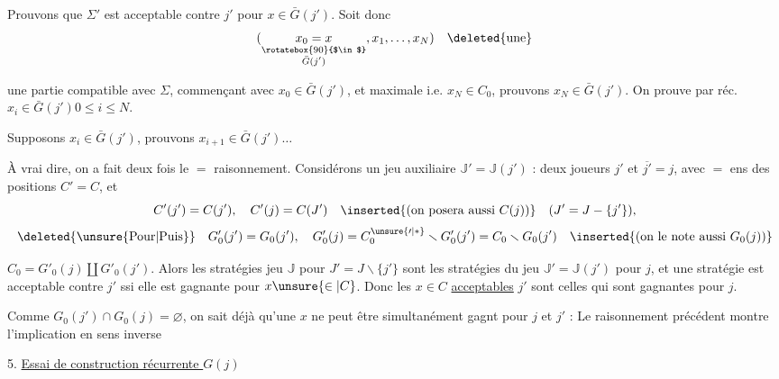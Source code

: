 Prouvons que $\Sigma'$ est acceptable  contre $j'$ pour  $x\in\bar G(j')$. Soit donc
\[
(\underset{\substack{\rotatebox{90}{$\in$}\\\bar G(j')}}{x_0=x},x_1,\ldots,x_N)\quad\deleted{\text{une}}
\]


une partie compatible avec $\Sigma$, commençant avec $x_0\in\bar G(j')$, et maximale i.e. $x_N\in C_0$, prouvons $x_N\in\bar G(j')$. On  prouve par réc. $x_i\in\bar G(j')$\quad $0\leq i\leq N$.

Supposons $x_i\in\bar G(j')$,  prouvons $x_{i+1}\in\bar G(j')\ldots$

À vrai dire, on a fait deux fois le $=$ raisonnement. Considérons un jeu auxiliaire $\mathbb J'=\mathbb J(j')$ : deux joueurs $j'$ et $\overline{j'}=j$, avec $=$ ens des  positions $C'=C$,  et
\[
C'(j')=C(j'),\quad C'(j)=C(J')\quad\inserted{\text{(on posera aussi }C(j)\text{)}}\quad (J'=J-\{j'\}),
\]
\[
\deleted{\text{\unsure{Pour|Puis}}}\quad G'_0(j')=G_0(j'),\quad G'_0(j)=C^{\unsure{\prime|*}}_0\smallsetminus G'_0(j')=C_0\smallsetminus G_0(j')\quad\inserted{\text{(on le note aussi }G_0(j)\text{)}}
\]

 $C_0=G'_0(j)\amalg G'_0(j')$. Alors les stratégies  jeu $\mathbb J$ pour $J'=J\smallsetminus\{j'\}$ sont les stratégies du jeu $\mathbb J'=\mathbb J(j')$ pour $j$, et une stratégie  est acceptable  contre $j'$ ssi elle est gagnante pour $x\unsure{\in|C}$. Donc les  $x\in C$ \uline{acceptables}   $j'$  sont celles qui sont gagnantes pour $j$.


Comme $G_0(j')\cap G_0(j)=\varnothing$, on sait déjà qu'une $x$ ne peut être simultanément gagnt pour $j$ et $j'$ :  Le raisonnement précédent montre  l'implication en sens inverse



5. \uline{Essai de construction récurrente } $G(j)$

